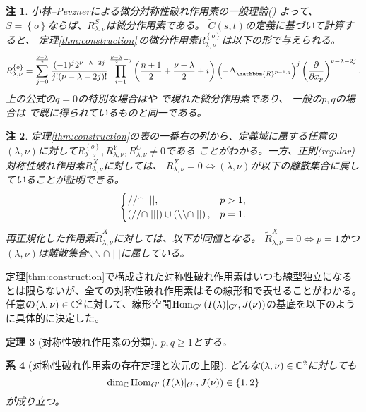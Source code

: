 \documentclass[12pt]{article} %
\newcommand{\Hom}{\mbox{\normalfont Hom}}
\newtheorem{theorem}{定理}
\newtheorem{remark}[theorem]{注}
\newtheorem{corollary}[theorem]{系}
\theoremstyle{definition}
\theoremstyle{exampstyle} \newtheorem{examp}[theorem]{Theorem}
\newcommand{\IlambdaGprime}{I(\lambda)\kern-0.3em\mid_{G'}}
\newcommand{\SBO}{\Hom_{G'}\left(\IlambdaGprime,J(\nu) \right)}
\begin{document}
\begin{remark}
	小林--Pevznerによる微分対称性破れ作用素の一般理論(\cite[Chap.\ 2]{kobayashi2016differential1})
	よって、
	$S=\left\{ o \right\}$ならば、$R_{\lambda,\nu}^S$は微分作用素である。
	$\tilde{C}(s,t)$の定義に基づいて計算すると、
	定理\ref{thm:construction}\,の微分作用素$R_{\lambda,\nu}^{ \left\{ o \right\}}$は以下の形で与えられる。
	\begin{equation*}
		R_{\lambda,\nu}^{ \left\{ o \right\}}=
		\sum_{j=0}^{\frac{\nu-\lambda}{2}}\frac{(-1)^j2^{\nu-\lambda-2j}}{j!(\nu-\lambda-2j)!}\prod_{i=1}^{\frac{\nu-\lambda}{2}-j}\left( \frac{n
		+1}{2}+\frac{\nu+\lambda}{2}
		+i \right)\left(- \Delta_{\mathbbm{R}^{p-1,q}} \right)^j\left( \frac{\partial}{\partial x_p} \right)^{\nu-\lambda-2j}.
	\end{equation*}
	上の公式の$q=0$の特別な場合は\cite[Thms. 5.1.1 and 5.2.1]{juhl2009families}や\cite[(10.1)]{kobayashi2015symmetry}
	で現れた微分作用素であり、
	一般の$p,q$の場合は
	\cite[Thm.\ 4.3]{kobayashi2015branching}で既に得られているものと同一である。
\end{remark}
\begin{remark}\label{rmk:thm:construction}
	定理\ref{thm:construction}\;の表の一番右の列から、定義域に{属}する任意の
	$(\lambda,\nu)$に対して$R_{\lambda,\nu}^{ \left\{ o \right\}},R_{\lambda,\nu}^Y,R_{\lambda,\nu}^C\neq0$である
	ことがわかる。一方、正則(regular)対称性破れ作用素$R_{\lambda,\nu}^X$に対しては、
	$R^X_{\lambda,\nu}=0\iff(\lambda,\nu)$が以下の離散集合に属していることが証明できる。
	\[\begin{cases}
			//\cap\mid\mid\mid,&p>1,\\
			\left(//\cap\mid\mid\mid\right) \cup \left(\backslash\backslash\cap\mid\mid\right),&p=1.
		\end{cases}
	\]
	再正規化した作用素$\tilde{R}_{\lambda,\nu}^X$に対しては{、}以下が同値となる。
	$\tilde{R}_{\lambda,\nu}^X=0\iff p=1$かつ$(\lambda,\nu)$は離散集合$\backslash\backslash\cap \mid\mid$に属している。
\end{remark}
定理\ref{thm:construction}で構成された対称性破れ作用素はいつも線型独立になるとは限らないが、全ての対称性破れ作用素はその線形和で表せることがわかる。
任意の$(\lambda,\nu)\in\mathbb{C}^2$に対して、線形空間$\SBO$の基底を以下のように具体的に決定した。
\begin{theorem}[対称性破れ作用素の分類]\label{thm:classif}
	$p,q\ge1$とする。
\end{theorem}
\begin{corollary}[対称性破れ作用素の{{存在}}定理と次元の上限]\label{cor:classif}
	どんな$(\lambda,\nu)\in\mathbb{C}^2$に対しても
	$$\dim_{\C}\SBO\in\left\{ 1,2 \right\}$$が成り立つ。
\end{corollary}
\end{document}
